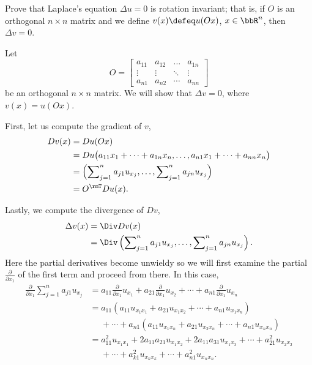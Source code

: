 \begin{problem}
  Prove that Laplace's equation \(\Delta u=0\) is rotation invariant; that
  is, if \(O\) is an orthogonal \(n\times n\) matrix and we define
  \(v(x)\defeq u(Ox)\), \(x\in\bbR^n\), then \(\Delta v=0\).
\end{problem}
\begin{solution}
  Let
  \[
    O=
    \begin{bmatrix}
      a_{11}&a_{12}&\dotsc&a_{1n}\\
      \vdots&\vdots&\ddots&\vdots\\
      a_{n1}&a_{n2}&\cdots&a_{nn}
    \end{bmatrix}
  \]
  be an orthogonal \(n\times n\) matrix. We will show that \(\Delta v=0\),
  where \(v(x)=u(Ox)\).

  First, let us compute the gradient of \(v\),
  \begin{align*}
    Dv(x)
    &=Du(Ox)\\
    &=Du\bigl(a_{11}x_1+\dotsb+a_{1n}x_n,\dotsc,a_{n1}x_1+\dotsb+a_{nn}x_n\bigr)\\
    &=\left(\sum\nolimits_{j=1}^na_{j1}u_{x_j},%
      \dotsc,%
      \sum\nolimits_{j=1}^n a_{jn}u_{x_j}\right)\\
    &=O^\rmT Du(x).
  \end{align*}

  Lastly, we compute the divergence of \(Dv\),
  \begin{align*}
    \Delta v(x)
    &=\Div Dv(x)\\
    &=\Div%
      \left(\sum\nolimits_{j=1}^na_{j1}u_{x_j},%
      \dotsc,%
      \sum\nolimits_{j=1}^n a_{jn}u_{x_j}\right).
  \end{align*}
  Here the partial derivatives become unwieldy so we will first examine the
  partial \(\frac{\partial}{\partial x_1}\) of the first term and proceed
  from there. In this case,
  \begin{align*}
    \frac{\partial}{\partial x_1}\sum_{j=1}^n a_{j1}u_{x_j}
    &=a_{11}\tfrac{\partial}{\partial x_1}u_{x_1}%
      +a_{21}\tfrac{\partial}{\partial x_1}u_{x_2}%
      +\dotsb%
      +a_{n1}\tfrac{\partial}{\partial x_1}u_{x_n}\\
    &=a_{11}(a_{11}u_{x_1x_1}+a_{21}u_{x_1x_2}+\dotsb+a_{n1}u_{x_1x_n})\\
    &\phantom{{}={}}+\dotsb+a_{n1}(a_{11}u_{x_1x_n}+a_{21}u_{x_2x_n}%
      +\dotsb+a_{n1}u_{x_nx_n})\\
    &=a_{11}^2u_{x_1x_1}+2a_{11}a_{21}u_{x_1x_2}+2a_{11}a_{31}u_{x_1x_3}
      +\dotsb+a_{21}^2u_{x_2x_2}\\
    &\phantom{{}={}}+\dotsb+a_{k1}^2u_{x_kx_k}+\dotsb+a_{n1}^2u_{x_nx_n}.
  \end{align*}


\end{solution}
